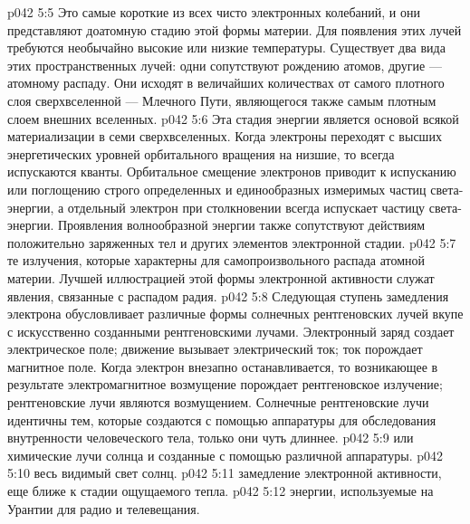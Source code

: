 \vs p042 5:5 \bibnobreakspace {} Это самые короткие из всех чисто электронных колебаний, и они представляют доатомную стадию этой формы материи. Для появления этих лучей требуются необычайно высокие или низкие температуры. Существует два вида этих пространственных лучей: одни сопутствуют рождению атомов, другие --- атомному распаду. Они исходят в величайших количествах от самого плотного слоя сверхвселенной --- Млечного Пути, являющегося также самым плотным слоем внешних вселенных.
\vs p042 5:6 \bibnobreakspace {} Эта стадия энергии является основой всякой материализации в семи сверхвселенных. Когда электроны переходят с высших энергетических уровней орбитального вращения на низшие, то всегда испускаются кванты. Орбитальное смещение электронов приводит к испусканию или поглощению строго определенных и единообразных измеримых частиц света\hyp{}энергии, а отдельный электрон при столкновении всегда испускает частицу света\hyp{}энергии. Проявления волнообразной энергии также сопутствуют действиям положительно заряженных тел и других элементов электронной стадии.
\vs p042 5:7 \bibnobreakspace {} те излучения, которые характерны для самопроизвольного распада атомной материи. Лучшей иллюстрацией этой формы электронной активности служат явления, связанные с распадом радия.
\vs p042 5:8 \bibnobreakspace {} Следующая ступень замедления электрона обусловливает различные формы солнечных рентгеновских лучей вкупе с искусственно созданными рентгеновскими лучами. Электронный заряд создает электрическое поле; движение вызывает электрический ток; ток порождает магнитное поле. Когда электрон внезапно останавливается, то возникающее в результате электромагнитное возмущение порождает рентгеновское излучение; рентгеновские лучи являются  возмущением. Солнечные рентгеновские лучи идентичны тем, которые создаются с помощью аппаратуры для обследования внутренности человеческого тела, только они чуть длиннее.
\vs p042 5:9 \bibnobreakspace {} или химические лучи солнца и созданные с помощью различной аппаратуры.
\vs p042 5:10 \bibnobreakspace {} весь видимый свет солнц.
\vs p042 5:11 \bibnobreakspace {} замедление электронной активности, еще ближе к стадии ощущаемого тепла.
\vs p042 5:12 \bibnobreakspace {} энергии, используемые на Урантии для радио и телевещания.
